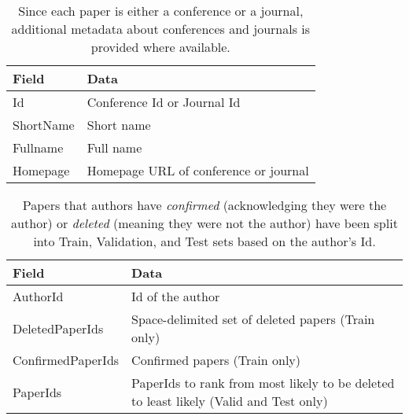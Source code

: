 \begin{table}
\begin{tabular}{| l | p{8cm} |} \hline
\textbf{Field} & \textbf{Data}  \\ \hline
Id & Conference Id or Journal Id  \\ \hline
ShortName & Short name  \\ \hline
Fullname & Full name  \\ \hline
Homepage & Homepage URL of conference or journal  \\ \hline
\end{tabular}
\caption{Since each paper is either a conference or a journal, additional metadata about conferences and journals is provided where available.}
\end{table}
\clearpage

\begin{table}
\begin{tabular}{| l | p{8cm} |} \hline
\textbf{Field} & \textbf{Data}  \\ \hline
AuthorId & Id of the author \\ \hline
DeletedPaperIds & Space-delimited set of deleted papers (Train only)  \\ \hline
ConfirmedPaperIds  & Confirmed papers (Train only)  \\ \hline
PaperIds & PaperIds to rank from most likely to be deleted to least likely (Valid and Test only)  \\ \hline
\end{tabular}
\caption{Papers that authors have \emph{confirmed} (acknowledging they were the author) or \emph{deleted} (meaning they were not the author) have been split into Train, Validation, and Test sets based on the author's Id.}
\end{table}

